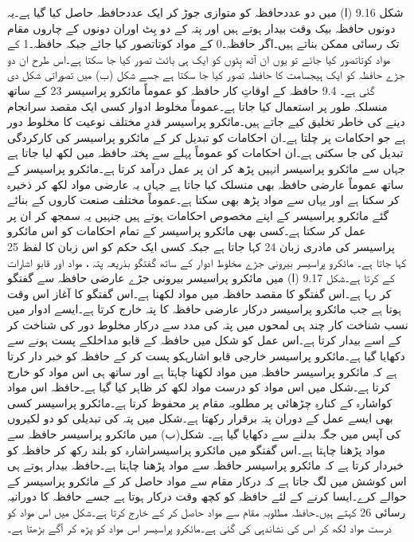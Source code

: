	شکل 9.16 (ا) میں دو عددحافظہ کو متوازی جوڑ کر ایک عددحافظہ حاصل کیا گیا ہے۔یہ دونوں حافظہ بیک وقت بیدار ہوتے ہیں اور پتہ کے دو بِٹ اوران دونوں کے چاروں مقام تک رسائی ممکن بناتے ہیں۔اگر حافظہ۔0 کے مواد کوتاتصور کیا جائے جبکہ حافظہ۔1 کے مواد کوتاتصور کیا جائے تو یوں ان آٹھ بِٹوں کو ایک ہی بائٹ تصور کیا جا سکتا ہے۔اس طرح ان دو جڑے حافظہ کو ایک ہیجسامت کا حافظہ تصور کیا جا سکتا ہے جسے شکل (ب) میں تصوراتی شکل دی گئی ہے۔ 
9.4 حافظہ کے اوقاتِ کار
	حافظہ کو عموماً مائکرو پراسیسر 23 کے ساتھ منسلکہ طور پر استعمال کیا جاتا ہے۔عموماً مخلوط ادوار کسی ایک مقصد سرانجام دینے کی خاطر تخلیق کیے جاتے ہیں۔مائکرو پراسیسر قدرِ مختلف نوعیت کا مخلوط دور ہے جو احکامات پر چلتا ہے۔ان احکامات کو تبدیل کر کے  مائکرو پراسیسر کی کارکردگی تبدیل کی جا سکتی ہے۔ان احکامات کو عموماً پہلے سے پختہ حافظہ میں لکھ لیا جاتا ہے جہاں سے مائکرو پراسیسر انہیں پڑھ کر ان پر عمل درآمد کرتا ہے۔مائکرو پراسیسر کے ساتھ عموماً عارضی حافظہ بھی منسلک کیا جاتا ہے جہاں یہ عارضی مواد لکھ کر ذخیرہ کر سکتا ہے اور یہاں سے مواد پڑھ بھی سکتا ہے۔عموماً مختلف صنعت کاروں کے بنائے گئے مائکرو پراسیسر کے اپنے مخصوص احکامات ہوتے ہیں جنہیں یہ سمجھ کر ان پر عمل کر سکتا ہے۔کسی بھی مائکرو پراسیسر کے تمام احکامات کو اس مائکرو پراسیسر کی مادری زبان 24 کہا جاتا ہے جبکہ کسی ایک حکم کو اس زبان کا لفظ 25 کہا جاتا ہے۔
	مائکرو پراسیسر بیرونی جڑے مخلوط ادوار کے ساتھ گفتگو بذریعہ پتہ ، مواد اور قابو اشارات کے کرتا ہے۔شکل 9.17 (ا) میں مائکرو پراسیسر بیرونی جڑے عارضی حافظہ سے گفتگو کر رہا ہے۔اس گفتگو کا مقصد حافظہ میں مواد لکھنا ہے۔اس گفتگو کا آغاز اس وقت ہوتا ہے جب  مائکرو پراسیسر درکار عارضی حافظہ کا پتہ خارج کرتا ہے۔ایسے ادوار میں نسب شناخت کار چند ہی لمحوں میں پتہ کی مدد سے درکار مخلوط دور کی شناخت کر کے اسے بیدار کرتا ہے۔اس عمل کو شکل میں حافظہ کے قابو مداخلکے پست ہونے سے دکھایا گیا ہے۔مائکرو پراسیسر خارجی قابو اشارہکو پست کر کے حافظہ کو خبر دار کرتا ہے کہ مائکرو پراسیسر حافظہ میں مواد لکھنا چاہتا ہے اور ساتھ ہی اس مواد کو خارج کرتا ہے۔شکل میں اس مواد کو درست مواد لکھ کر ظاہر کیا گیا ہے۔حافظہ اس مواد کواشارہ کے کنارہِ چڑھائی پر مطلوبہ مقام پر محفوظ کرتا ہے۔مائکرو پراسیسر کسی بھی ایسے  عمل کے دوران  پتہ برقرار رکھتا ہے۔شکل میں پتہ کی تبدیلی کو دو لکیروں کی آپس میں جگہ بدلنے سے دکھایا گیا ہے۔
	شکل(ب) میں مائکرو پراسیسر حافظہ سے مواد پڑھنا چاہتا ہے۔اس گفتگو میں مائکرو پراسیسراشارہ کو بلند رکھ کر حافظہ کو خبردار کرتا ہے کہ مائکرو پراسیسر حافظہ سے مواد پڑھنا چاہتا ہے۔حافظہ بیدار ہوتے ہی اس کوشش میں لگ جاتا ہے کہ درکار مقام سے مواد حاصل کر کے مائکرو پراسیسر کے حوالے کرے۔ایسا کرنے کے لئے حافظہ کو کچھ وقت درکار ہوتا ہے جسے  حافظہ کا دورانیہ رسائی 26 کہتے ہیں۔حافظہ مطلوبہ مقام سے مواد حاصل کر کے خارج کرتا ہے۔شکل میں اس مواد کو درست مواد لکھ کر اس کی نشاندہی کی گئی ہے۔مائکرو پراسیسر اس مواد کو پڑھ کر آگے بڑھتا ہے۔

